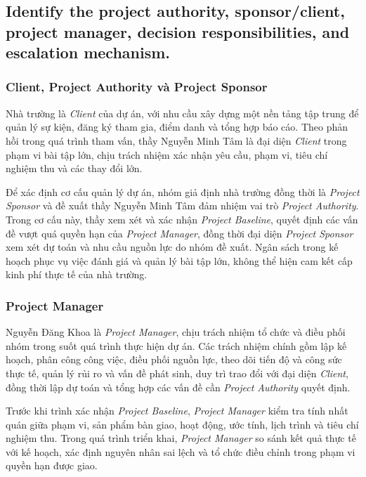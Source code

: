\subsection{Identify the project authority, sponsor/client, project manager, decision responsibilities, and escalation mechanism.}

\subsubsection{Client, Project Authority và Project Sponsor}

Nhà trường là \textit{Client} của dự án, với nhu cầu xây dựng một nền tảng tập trung để quản lý sự kiện, đăng ký tham gia, điểm danh và tổng hợp báo cáo. Theo phản hồi trong quá trình tham vấn, thầy Nguyễn Minh Tâm là đại diện \textit{Client} trong phạm vi bài tập lớn, chịu trách nhiệm xác nhận yêu cầu, phạm vi, tiêu chí nghiệm thu và các thay đổi lớn.

Để xác định cơ cấu quản lý dự án, nhóm giả định nhà trường đồng thời là \textit{Project Sponsor} và đề xuất thầy Nguyễn Minh Tâm đảm nhiệm vai trò \textit{Project Authority}. Trong cơ cấu này, thầy xem xét và xác nhận \textit{Project Baseline}, quyết định các vấn đề vượt quá quyền hạn của \textit{Project Manager}, đồng thời đại diện \textit{Project Sponsor} xem xét dự toán và nhu cầu nguồn lực do nhóm đề xuất. Ngân sách trong kế hoạch phục vụ việc đánh giá và quản lý bài tập lớn, không thể hiện cam kết cấp kinh phí thực tế của nhà trường.

\subsubsection{Project Manager}

Nguyễn Đăng Khoa là \textit{Project Manager}, chịu trách nhiệm tổ chức và điều phối nhóm trong suốt quá trình thực hiện dự án. Các trách nhiệm chính gồm lập kế hoạch, phân công công việc, điều phối nguồn lực, theo dõi tiến độ và công sức thực tế, quản lý rủi ro và vấn đề phát sinh, duy trì trao đổi với đại diện \textit{Client}, đồng thời lập dự toán và tổng hợp các vấn đề cần \textit{Project Authority} quyết định.

Trước khi trình xác nhận \textit{Project Baseline}, \textit{Project Manager} kiểm tra tính nhất quán giữa phạm vi, sản phẩm bàn giao, hoạt động, ước tính, lịch trình và tiêu chí nghiệm thu. Trong quá trình triển khai, \textit{Project Manager} so sánh kết quả thực tế với kế hoạch, xác định nguyên nhân sai lệch và tổ chức điều chỉnh trong phạm vi quyền hạn được giao.

